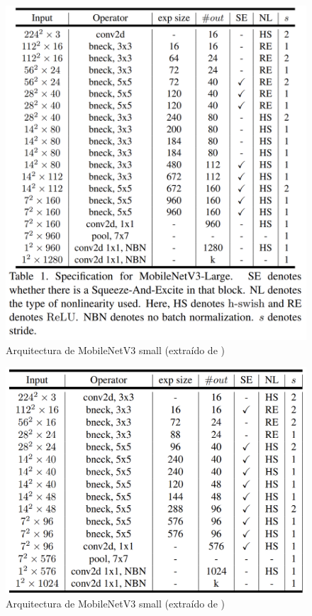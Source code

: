 \begin{figure}[H]
	\label{fig:mbnetlarge}
	\centering
	\includegraphics[scale = 0.25]{imagenes/mbnetv3-large.png}
	\caption{Arquitectura de MobileNetV3 small (extraído de \cite{howard2019searching})}
\end{figure}


\begin{figure}[H]
	\label{fig:mbnetsmall}
	\centering
	\includegraphics[scale = 0.25]{imagenes/mbnetv3-small.png}
	\caption{Arquitectura de MobileNetV3 small (extraído de \cite{howard2019searching})}
\end{figure}


